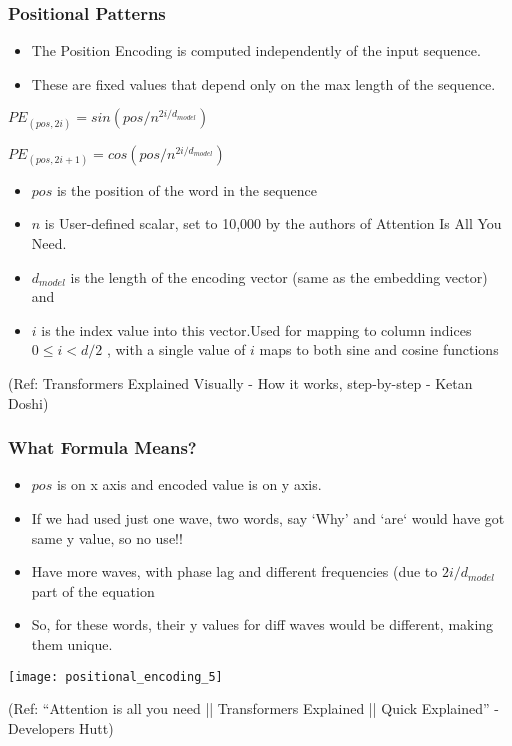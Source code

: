 \begin{frame}[fragile]\frametitle{Positional Patterns}

\begin{itemize}
\item The Position Encoding is computed independently of the input sequence. 
\item These are fixed values that depend only on the max length of the sequence. 
\end{itemize}

$PE_{(pos,2i)} = sin(pos/n^{2i/d_{model}})$


$PE_{(pos,2i+1)} = cos(pos/n^{2i/d_{model}})$

\begin{itemize}
\item $pos$ is the position of the word in the sequence
\item $n$ is User-defined scalar, set to 10,000 by the authors of Attention Is All You Need.
\item $d_{model}$ is the length of the encoding vector (same as the embedding vector) and
\item $i$ is the index value into this vector.Used for mapping to column indices $0 \leq i < d/2$ , with a single value of $i$
 maps to both sine and cosine functions
\end{itemize}

{\tiny (Ref: Transformers Explained Visually - How it works, step-by-step - Ketan Doshi)}

\end{frame}

\begin{frame}[fragile]\frametitle{What Formula Means?}

\begin{itemize}
\item $pos$ is on x axis and encoded value is on y axis.
\item If we had used just one wave, two words, say `Why' and `are` would have got same y value, so no use!!
\item Have more waves, with phase lag and different frequencies (due to $2i/d_{model}$ part of the equation
\item So, for these words, their y values for diff waves would be different, making them unique.
\end{itemize}


\begin{center}
\texttt{[image: positional\_encoding\_5]}


{\tiny (Ref: ``Attention is all you need || Transformers Explained || Quick Explained'' - Developers Hutt)}
\end{center}		

\end{frame}


